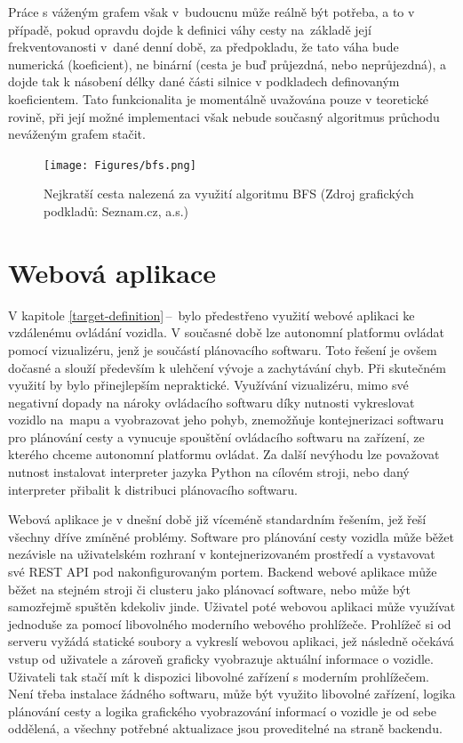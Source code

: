 \documentclass[czech, bachelor]{diploma}
\newcommand{\filipref}[1]{\ref{#1}\,--\,\nameref{#1}}
\begin{document}
Práce s váženým grafem však v~budoucnu může reálně být potřeba, a to v případě, pokud opravdu dojde k definici váhy cesty
na~základě její frekventovanosti v~dané denní době, za předpokladu, že tato váha bude numerická (koeficient), ne binární 
(cesta je buď průjezdná, nebo neprůjezdná), a dojde tak k násobení délky dané části silnice v podkladech definovaným koeficientem.
Tato funkcionalita je momentálně uvažována pouze v teoretické rovině, při její možné implementaci však nebude současný algoritmus
průchodu neváženým grafem stačit.

\begin{figure}
    \centering
    \texttt{[image: Figures/bfs.png]}
    \caption{Nejkratší cesta nalezená za využití algoritmu BFS (Zdroj grafických podkladů: Seznam.cz, a.s.)}
    \label{fig:bfs}
\end{figure}

\chapter{Webová aplikace} \label{web-app}

V kapitole \filipref{target-definition} bylo předestřeno využití webové aplikaci ke vzdálenému ovládání vozidla. V současné době
lze autonomní platformu ovládat pomocí vizualizéru, jenž je součástí plánovacího softwaru. Toto řešení je ovšem dočasné a slouží
především k ulehčení vývoje a zachytávání chyb. Při skutečném využití by bylo přinejlepším nepraktické. Využívání vizualizéru,
mimo své negativní dopady na nároky ovládacího softwaru díky nutnosti vykreslovat vozidlo na~mapu a vyobrazovat jeho pohyb,
znemožňuje kontejnerizaci softwaru pro plánování cesty a vynucuje spouštění ovládacího softwaru na zařízení, ze kterého chceme
autonomní platformu ovládat. Za další nevýhodu lze považovat nutnost instalovat interpreter jazyka Python na cílovém stroji, nebo
daný interpreter přibalit k distribuci plánovacího softwaru.

Webová aplikace je v dnešní době již víceméně standardním řešením, jež řeší všechny dříve zmíněné problémy. Software pro plánování
cesty vozidla může běžet nezávisle na uživatelském rozhraní v kontejnerizovaném prostředí a vystavovat své REST API
pod nakonfigurovaným portem. Backend webové aplikace může běžet na stejném stroji či clusteru jako plánovací software, nebo může
být samozřejmě spuštěn kdekoliv jinde. Uživatel poté webovou aplikaci může využívat jednoduše za pomocí libovolného moderního
webového prohlížeče. Prohlížeč si od serveru vyžádá statické soubory a vykreslí webovou aplikaci, jež následně očekává vstup
od uživatele a zároveň graficky vyobrazuje aktuální informace o vozidle. Uživateli tak stačí mít k dispozici libovolné zařízení
s moderním prohlížečem. Není třeba instalace žádného softwaru, může být využito libovolné zařízení, logika plánování cesty
a logika grafického vyobrazování informací o vozidle je od sebe oddělená, a všechny potřebné aktualizace jsou proveditelné
na straně backendu.
\end{document}

